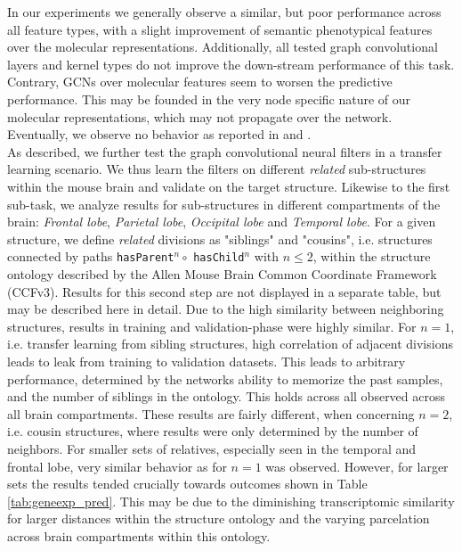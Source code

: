 \documentclass[]{article}
\begin{document}
In our experiments we generally observe a similar, but poor performance across all feature types, with a slight improvement of semantic phenotypical features over the molecular representations. Additionally, all tested graph convolutional layers and kernel types do not improve the down-stream performance of this task. Contrary, GCNs over molecular features seem to worsen the predictive performance. This may be founded in the very node specific nature of our molecular representations, which may not propagate over the network. Eventually, we observe no behavior as reported in \citet{schulte2021integration} and \citet{wang2021mogonet}.\\

As described, we further test the graph convolutional neural filters in a transfer learning scenario. We thus learn the filters on different \textit{related} sub-structures within the mouse brain and validate on the target structure. Likewise to the first sub-task, we analyze results for sub-structures in different compartments of the brain: \textit{Frontal lobe}, \textit{Parietal lobe}, \textit{Occipital lobe } and \textit{Temporal lobe}.
For a given structure, we define \textit{related} divisions as "siblings" and "cousins", i.e. structures connected by paths \verb*|hasParent|$^n \circ$ \verb*|hasChild|$^n$ with $n\leq2$, within the structure ontology described by the Allen Mouse Brain Common Coordinate Framework (CCFv3). 
Results for this second step are not displayed in a separate table, but may be described here in detail. Due to the high similarity between neighboring structures, results in training and validation-phase were highly similar. For $n=1$, i.e. transfer learning from sibling structures, high correlation of adjacent divisions leads to leak from training to validation datasets. This leads to arbitrary performance, determined by the networks ability to memorize the past samples, and the number of siblings in the ontology. This holds across all observed across all brain compartments.
These results are fairly different, when concerning $n=2$, i.e. cousin structures, where results were only determined by the number of neighbors. For smaller sets of relatives, especially seen in the temporal and frontal lobe, very similar behavior as for $n=1$ was observed. However, for larger sets the results tended crucially towards outcomes shown in Table \ref{tab:geneexp_pred}. This may be due to the diminishing transcriptomic similarity for larger distances within the structure ontology and the varying parcelation across brain compartments within this ontology. \\
\end{document}
